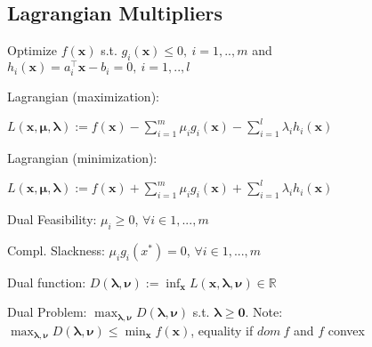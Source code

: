 
\subsection*{Lagrangian Multipliers}
Optimize  $f(\mathbf{x})$ s.t. $g_i(\mathbf{x}) \leq 0,\ i = 1, .., m$ and $h_i(\mathbf{x})=a_i^\top\mathbf{x} - b_i = 0,\ i = 1, .., l$
\begin{compactdesc}
	\item[Lagrangian (maximization):]
	\item $L(\mathbf{x}, \boldsymbol{\mu}, \boldsymbol{\lambda}) := f(\mathbf{x}) - \sum_{i=1}^m \mu_i g_i(\mathbf{x}) - \sum_{i=1}^l \lambda_i h_i(\mathbf{x})$
	\item[Lagrangian (minimization):]
	\item $L(\mathbf{x}, \boldsymbol{\mu}, \boldsymbol{\lambda}) := f(\mathbf{x}) + \sum_{i=1}^m \mu_i g_i(\mathbf{x}) + \sum_{i=1}^l \lambda_i h_i(\mathbf{x})$
	\item[Dual Feasibility:] $\mu_i \ge 0$, $\forall i \in {1,...,m}$
	\item[Compl. Slackness:] $\mu_i g_i(x^*) = 0$, $\forall i \in {1,...,m}$
	\item[Dual function:] $D(\boldsymbol{\lambda}, \boldsymbol{\nu}) := \inf_{\mathbf{x}} L(\mathbf{x}, \boldsymbol{\lambda}, \boldsymbol{\nu}) \in \mathbb{R}$
	\item[Dual Problem:] $\max_{\boldsymbol{\lambda}, \boldsymbol{\nu}} D(\boldsymbol{\lambda}, \boldsymbol{\nu})$ s.t. $\boldsymbol{\lambda} \geq \mathbf{0}$. Note: $\max_{\boldsymbol{\lambda}, \boldsymbol{\nu}} D(\boldsymbol{\lambda}, \boldsymbol{\nu}) \le \min_\mathbf{x}{f(\mathbf{x})}$, equality if $dom\ f$ and $f$ convex
\end{compactdesc}

